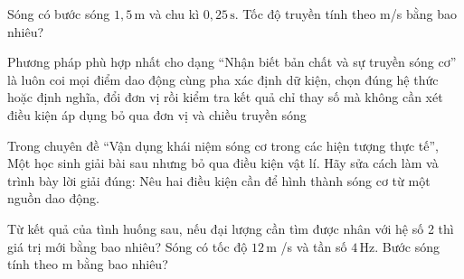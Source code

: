 \begin{ex}
Sóng có bước sóng $1,5\,\text{m}$ và chu kì $0,25\,\text{s}$. Tốc độ truyền tính theo m/s bằng bao nhiêu?
\end{ex}

\begin{ex}
Phương pháp phù hợp nhất cho dạng “Nhận biết bản chất và sự truyền sóng cơ” là
\choice
{luôn coi mọi điểm dao động cùng pha}
{\True xác định dữ kiện, chọn đúng hệ thức hoặc định nghĩa, đổi đơn vị rồi kiểm tra kết quả}
{chỉ thay số mà không cần xét điều kiện áp dụng}
{bỏ qua đơn vị và chiều truyền sóng}
\end{ex}

\begin{ex}
Trong chuyên đề “Vận dụng khái niệm sóng cơ trong các hiện tượng thực tế”, Một học sinh giải bài sau nhưng bỏ qua điều kiện vật lí. Hãy sửa cách làm và trình bày lời giải đúng: Nêu hai điều kiện cần để hình thành sóng cơ từ một nguồn dao động.
\choiceTF

\end{ex}

\begin{ex}
Từ kết quả của tình huống sau, nếu đại lượng cần tìm được nhân với hệ số 2 thì giá trị mới bằng bao nhiêu? Sóng có tốc độ $12\,\text{m}$ /s và tần số $4\,\text{Hz}$. Bước sóng tính theo m bằng bao nhiêu?
\end{ex}

